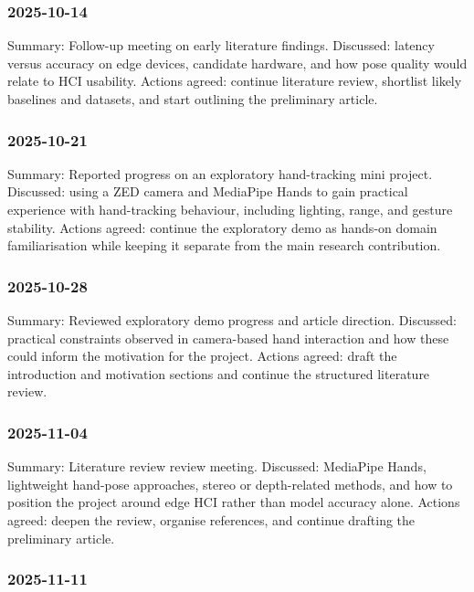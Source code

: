 ﻿\documentclass[11pt,a4paper]{article}
\begin{document}
\subsubsection*{2025-10-14}

Summary: Follow-up meeting on early literature findings.
Discussed: latency versus accuracy on edge devices, candidate hardware, and how
pose quality would relate to HCI usability.
Actions agreed: continue literature review, shortlist likely baselines and
datasets, and start outlining the preliminary article.

\subsubsection*{2025-10-21}

Summary: Reported progress on an exploratory hand-tracking mini project.
Discussed: using a ZED camera and MediaPipe Hands to gain practical experience
with hand-tracking behaviour, including lighting, range, and gesture stability.
Actions agreed: continue the exploratory demo as hands-on domain familiarisation
while keeping it separate from the main research contribution.

\subsubsection*{2025-10-28}

Summary: Reviewed exploratory demo progress and article direction.
Discussed: practical constraints observed in camera-based hand interaction and
how these could inform the motivation for the project.
Actions agreed: draft the introduction and motivation sections and continue the
structured literature review.

\subsubsection*{2025-11-04}

Summary: Literature review review meeting.
Discussed: MediaPipe Hands, lightweight hand-pose approaches, stereo or
depth-related methods, and how to position the project around edge HCI rather
than model accuracy alone.
Actions agreed: deepen the review, organise references, and continue drafting
the preliminary article.

\subsubsection*{2025-11-11}
\end{document}
